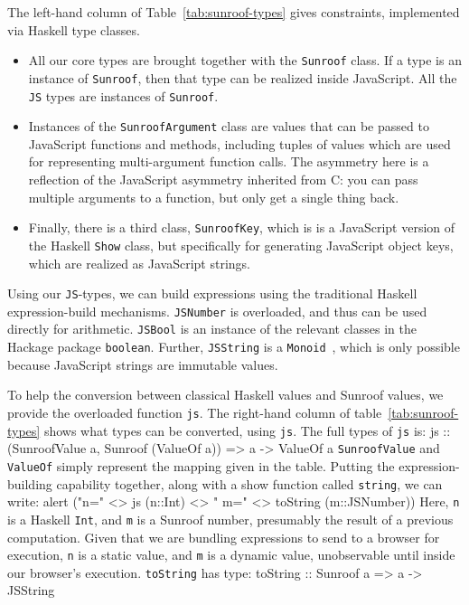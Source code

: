 \documentclass{llncs}
\newcommand{\Src}[1]{{\tt{#1}}}
\newenvironment{Code}{\verbatim}{\endverbatim}
\begin{document}
The left-hand column of Table~\ref{tab:sunroof-types} gives constraints,
implemented via Haskell type classes.
\begin{itemize}
\item  All our core types are brought together with the \Src{Sunroof} class.
If a type is an instance of \Src{Sunroof}, then that type can be realized inside JavaScript.
All the \Src{JS} types are instances of \Src{Sunroof}.

\item Instances of the \Src{SunroofArgument} class
are values that can be passed to JavaScript functions and methods,
including tuples of values which are used for representing multi-argument 
function calls.
The asymmetry here is a reflection of the JavaScript
asymmetry inherited from C: you can pass multiple arguments
to a function, but only get a single thing back.

\item Finally, there is a third class, \Src{SunroofKey}, which is
is a JavaScript version of the Haskell \Src{Show} class,
but specifically for generating JavaScript object keys,
which are realized as JavaScript strings.
\end{itemize}

Using our \Src{JS}-types, we can build expressions using the traditional Haskell expression-build
mechanisms. \Src{JSNumber} is overloaded, and thus can be used directly for arithmetic.
\Src{JSBool} is an instance of the relevant classes in the Hackage package \verb|boolean|.
Further, \Src{JSString} is a \Src{Monoid}~\cite{..}, which is only possible because JavaScript
strings are immutable values.

To help the conversion between classical Haskell values and Sunroof values,
we provide the overloaded function \Src{js}. The right-hand column of 
table~\ref{tab:sunroof-types} shows what types can be converted, using \Src{js}.
The full types of \Src{js} is:
\begin{Code}
js :: (SunroofValue a, Sunroof (ValueOf a)) => a -> ValueOf a
\end{Code}
\Src{SunroofValue} and \Src{ValueOf} simply represent the mapping given in the table.
%
Putting the expression-building capability together, 
along with a show function called \Src{string}, we can write:
\begin{Code}
  alert ("n=" <> js (n::Int) <> " m=" <> toString (m::JSNumber))
\end{Code}
Here, \Src{n} is a Haskell \Src{Int}, and \Src{m} is a Sunroof number,
presumably the result of a previous computation. Given that we are 
bundling expressions to send to a browser for execution, \Src{n}
is a static value, and \Src{m} is a dynamic value, unobservable until inside our browser's execution.
\Src{toString} has type:
\begin{Code}
toString :: Sunroof a => a -> JSString
\end{Code}
\end{document}

